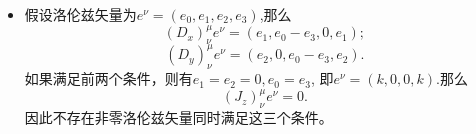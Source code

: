 \documentclass{article}
\begin{document}
\begin{enumerate}
\begin{itemize}
\begin{equation}
\begin{pmatrix}
          &1 & & \\
          1 & & & -1 \\
           & & & \\
           & 1 & & 
        \end{pmatrix}
      \end{equation} 
            \begin{equation}
        D_y=id_y=\left.\frac{\partial S}{\partial \beta}\right|_{\alpha=\beta=0}=i\begin{pmatrix}
          & &1 & \\
           & & &  \\
           1& & &-1 \\
           & & 1& 
        \end{pmatrix}
      \end{equation} 
      \begin{equation}
        J_z=i\begin{pmatrix}
          & & & \\
           & &-1 &  \\
           & 1& & \\
           & & & 
        \end{pmatrix}
      \end{equation}
      计算可得
      \begin{equation}
        \left[D_x,D_y\right]=0.
      \end{equation}
      \begin{equation}
        \left[J_z,D_x\right]=-d_y=iD_y
      \end{equation}
      \begin{equation}
        \left[J_z,D_y\right]=d_x=-iD_x
      \end{equation}
      \item [c.]假设洛伦兹矢量为$e^\nu=(e_0,e_1,e_2,e_3)$,那么 
      \begin{equation}
        (D_x)_\nu^\mu e^\nu=(e_1, e_0-e_3, 0, e_1);
      \end{equation}
      \begin{equation}
        (D_y)_\nu^\mu e^\nu=(e_2,0, e_0-e_3,  e_2).
      \end{equation}
      如果满足前两个条件，则有$e_1=e_2=0,e_0=e_3$, 即$e^\nu=(k,0,0,k)$.那么 
      \begin{equation}
        (J_z)_\nu^\mu e^\nu=0.
      \end{equation}
      因此不存在非零洛伦兹矢量同时满足这三个条件。
    \end{itemize}


\end{enumerate}
\end{document}
